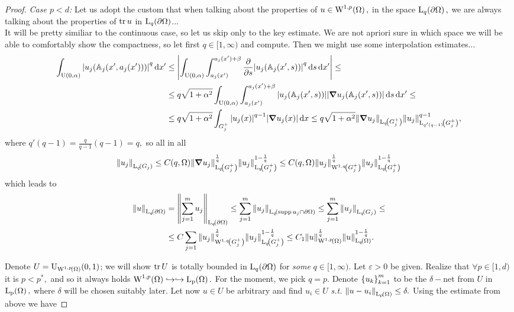 \documentclass{article}
\begin{document}
\begin{proof}
	\textit{Case $p<d$:}
	Let us adopt the custom that when talking about the properties of $u \in \WkpSet[1][p]{\Omega},$ in the space $\LpSet[q]{\partial \Omega},$ we are always talking about the properties of $\trace u$ in $\LpSet[q]{\partial \Omega}$...\\

It will be pretty similiar to the continuous case, so let us skip only to the key estimate. We are not apriori sure in which space we will be able to comfortably show the compactness, so let first $q \in [1, \infty)$ and compute. Then we might use some interpolation estimates...
\begin{align*}
	\int_{\text{U}(0,\alpha)}\abs{u_j\qty(\tensorq{A}_j\qty(x',a_j\qty(x')))}^q\dd{x'} &\leq \abs{\int_{\text{U}(0,\alpha)}\int_{a_j(x')}^{a_j(x')+\beta}\pdv{s} \abs{u_j\qty(\tensorq{A}_j\qty(x',s))}^q \dd{s}\dd{x'}}\leq \\
											   &\leq q \sqrt{1+\alpha^{2}}\int_{\text{U}(0,\alpha)}\int_{a_j(x')}^{a_j(x')+\beta}\abs{u_j\qty(\tensorq{A}_j\qty(x', s))}\abs{\grad u_j\qty(\tensorq{A}_j\qty(x',s))}\dd{s}\dd{x'} \leq \\
											   &\leq q \sqrt{1+\alpha^{2}}\int_{G_j^{+}}\abs{u_j(x)}^{q-1}\abs{\grad u_j(x)}\dd{x} \leq q \sqrt{1+\alpha^{2}}\norm{\grad u_j}_{\LpSet[q]{G_j^+}}\norm{u_j}_{\LpSet[q'(q-1)]{G_j^+}}^{q-1},
\end{align*}
where $q'(q-1) = \frac{q}{q-1}(q-1) = q,$ so all in all
\[
	\norm{u_j}_{\LpSet[q]{G_j}}\leq C(q, \Omega) \norm{\grad u_j}_{\LpSet[q]{G_j^+}}^\frac{1}{q}\norm{u_j}_{\LpSet[q]{G_j^{+}}}^{1-\frac{1}{q}}\leq C(q,\Omega) \norm{u_j}_{\WkpSet[1][q]{G_j^+}}^{\frac{1}{q}}\norm{u_j}_{\LpSet[q]{G_j^+}}^{1-\frac{1}{q}}
\]
which leads to 
\begin{align*}
	\norm{u}_{\LpSet[q]{\partial \Omega}} &= \norm{\sum_{j=1}^m u_j}_{\LpSet[q]{\partial \Omega}} \leq \sum_{j=1}^m \norm{u_j}_{\LpSet[q]{\supp u_j \cap \partial \Omega}} \leq \sum_{j=1}^m \norm{u_j}_{\LpSet[q]{G_j}} \leq \\
					      &\leq C \sum_{j=1}\norm{u_j}_{\WkpSet[1][q]{G_j^{+}}}^{\frac{1}{q}}\norm{u_j}_{\LpSet[q]{G_j^+}}^{1-\frac{1}{q}} \leq C_1 \norm{u}_{\WkpSet[1][p]{\Omega}}^{\frac{1}{q}}\norm{u}_{\LpSet[q]{\Omega}}^{1-\frac{1}{q}}.
\end{align*}

Denote $U = \text{U}_{\WkpSet[1][p]{\Omega}}(0,1)$; we will show $\trace U$ is totally bounded in $\LpSet[q]{\partial \Omega}$ for \textit{some} $q \in [1,\infty).$ Let $\varepsilon > 0$ be given. Realize that $\forall p \in [1,d)$ it is $p < p^{*},$ and so it always holds $\WkpSet[1][p]{\Omega} \hookrightarrow \hookrightarrow \LpSet{\Omega}.$ For the moment, we pick $q = p.$
Denote $\qty{u_k}_{k=1}^m$ to be the $\delta-$net from $U$ in $\LpSet{\Omega},$ where $\delta$ will be chosen suitably later. Let now $u \in U$ be arbitrary and find $u_i \in U$ \textit{s.t.} $\norm{u-u_i}_{\LpSet{\Omega}} \leq \delta.$ Using the estimate from above we have


\end{proof}
\end{document}
